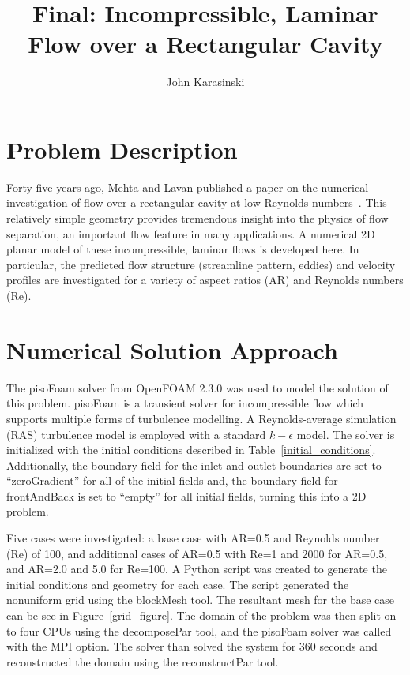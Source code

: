 \documentclass[twocolumn,10pt]{asme2ej}
\title{Final: Incompressible, Laminar Flow over a Rectangular Cavity}
\author{John Karasinski
    \affiliation{
  Graduate Student Researcher\\
  Center for Human/Robotics/Vehicle Integration and Performance\\
  Department of Mechanical and Aerospace Engineering\\
  University of California\\
  Davis, California 95616\\
    Email: karasinski@ucdavis.edu
    }
}
\begin{document}
\maketitle

\section{Problem Description}

Forty five years ago, Mehta and Lavan published a paper on the numerical investigation of flow over a rectangular cavity at low Reynolds numbers~\cite{mehta1969flow}. This relatively simple geometry provides tremendous insight into the physics of flow separation, an important flow feature in many applications. A numerical 2D planar model of these incompressible, laminar flows is developed here. In particular, the predicted flow structure (streamline pattern, eddies) and velocity profiles are investigated for a variety of aspect ratios (AR) and Reynolds numbers (Re).

\section{Numerical Solution Approach}

The pisoFoam solver from OpenFOAM 2.3.0 was used to model the solution of this problem. pisoFoam is a transient solver for incompressible flow which supports multiple forms of turbulence modelling. A Reynolds-average simulation (RAS) turbulence model is employed with a standard $k-\epsilon$ model. The solver is initialized with the initial conditions described in Table~\ref{initial_conditions}. Additionally, the boundary field for the inlet and outlet boundaries are set to ``zeroGradient'' for all of the initial fields and, the boundary field for frontAndBack is set to ``empty'' for all initial fields, turning this into a 2D problem.

Five cases were investigated: a base case with AR=0.5 and Reynolds number (Re) of 100, and additional cases of AR=0.5 with Re=1 and 2000 for AR=0.5, and AR=2.0 and 5.0 for Re=100. A Python script was created to generate the initial conditions and geometry for each case. The script generated the nonuniform grid using the blockMesh tool. The resultant mesh for the base case can be see in Figure~\ref{grid_figure}. The domain of the problem was then split on to four CPUs using the decomposePar tool, and the pisoFoam solver was called with the MPI option. The solver than solved the system for 360 seconds and reconstructed the domain using the reconstructPar tool.
\end{document}
